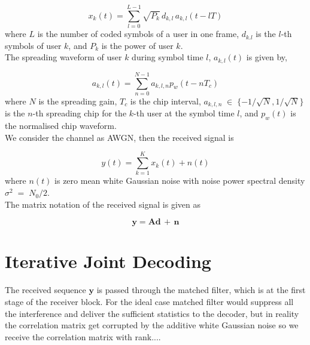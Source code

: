 \begin{equation}
x_k(t)=\sum\limits_{l=0}^{L-1}\sqrt{P_k}\,d_{k,l}\,a_{k,l}(t-lT)
\end{equation}
where $L$ is the number of coded symbols of a user in one frame, $d_{k.l}$ is the $l$-th symbols of user $k$, and $P_k$ is the power of user $k$.\\

The spreading waveform of user $k$ during symbol time $l$, $a_{k,l}(t)$ is given by,

\begin{equation}
a_{k,l}(t)=\sum\limits_{n=0}^{N-1}a_{k,l,n}p_{w}(t-nT_c)
\end{equation}
where $N$ is the spreading gain, $T_c$ is the chip interval, $a_{k,l,n}\;\in\;\{-1/\sqrt{N},1/\sqrt{N}\}$ is the $n$-th spreading chip for the $k$-th user at the symbol time $l$, and $p_w(t)$ is the normalised chip waveform.\\

We consider the channel as AWGN, then the received signal is 

\begin{equation}
y(t)=\sum\limits_{k=1}^{K}x_k(t)+n(t)
\end{equation}
where $n(t)$ is zero mean white Gaussian noise with noise power spectral density $\sigma^2\;=\;N_0/2$. \\

The matrix notation of the received signal is given as

\begin{equation}
\mathrm{\mathbf{y}}=\mathrm{\mathbf{A}}\mathrm{\mathbf{d}}\,+\,\mathrm{\mathbf{n}}
\end{equation}


\section{Iterative Joint Decoding}
The received sequence $\mathrm{\mathbf{y}}$ is passed through the matched filter, which is at the first stage of the receiver block. For the ideal case matched filter would suppress all the interference and deliver the sufficient statistics to the decoder, but in reality the correlation matrix get corrupted by the additive white Gaussian noise so we receive the correlation matrix with rank....\\

